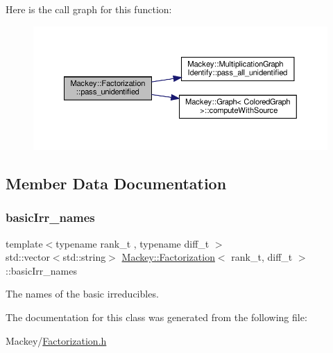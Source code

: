 Here is the call graph for this function\+:\nopagebreak
\begin{figure}[H]
\begin{center}
\leavevmode
\includegraphics[width=350pt]{classMackey_1_1Factorization_a0f1115a0af9f4fb294646aee85ebb2e4_cgraph}
\end{center}
\end{figure}


\subsection{Member Data Documentation}
\mbox{\label{classMackey_1_1Factorization_aafee5aadae0d83b75741e0e8c2955625}} 
\subsubsection{\texorpdfstring{basic\+Irr\+\_\+names}{basicIrr\_names}}
{\footnotesize\ttfamily template$<$typename rank\+\_\+t , typename diff\+\_\+t $>$ \\
std\+::vector$<$std\+::string$>$ \hyperlink{classMackey_1_1Factorization}{Mackey\+::\+Factorization}$<$ rank\+\_\+t, diff\+\_\+t $>$\+::basic\+Irr\+\_\+names}



The names of the basic irreducibles. 



The documentation for this class was generated from the following file\+:\begin{DoxyCompactItemize}
\item 
Mackey/\hyperlink{Factorization_8h}{Factorization.\+h}\end{DoxyCompactItemize}
